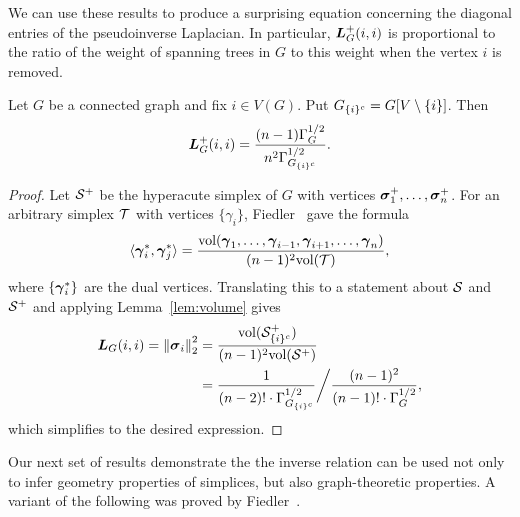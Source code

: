 We can  use these results to produce a surprising equation concerning  the diagonal entries of the pseudoinverse Laplacian. In particular, $\vb*{L}_G^+(i,i)$ is proportional to the ratio of the weight of  spanning trees in $G$ to this weight when the vertex $i$ is removed. 

\begin{lemma}
	\label{lem:L_G^+(i,i)_trees}
	Let $G$ be a connected graph and fix $i\in V(G)$. Put $G_{\{i\}^c}=G[V\setminus \{i\}]$. Then 
	\begin{equation}
	\vb*{L}_G^+(i,i) = \frac{(n-1)\Gamma_G^{1/2}}{n^2\Gamma_{G_{\{i\}^c}}^{1/2}}.
	\end{equation}
\end{lemma}
\begin{proof}
	Let $\mathcal{S}^+$ be  the hyperacute simplex of $G$ with vertices $\vb*{\sigma}_1^+,\dots,\vb*{\sigma}_n^+$. 
	For an arbitrary simplex $\mathcal{T}$ with vertices $\{\gamma_i\}$, 
Fiedler~\cite[Chapter 2]{fiedler2011matrices} gave  the formula 
	\begin{equation*}
	\langle \vb*{\gamma}_i^*,\vb*{\gamma}_j^*\rangle= \frac{\textnormal{vol}(\vb*{\gamma}_1,\dots,\vb*{\gamma}_{i-1},\vb*{\gamma}_{i+1},\dots,\vb*{\gamma}_n)}{(n-1)^2 \textnormal{vol}(\mathcal{T})},
	\end{equation*}
	where $\{\vb*{\gamma}_i^*\}$ are the dual vertices. Translating this to a statement about $\mathcal{S}$ and $\mathcal{S}^+$ and applying Lemma~\ref{lem:volume} gives 
	\begin{align*}
	\vb*{L}_G(i,i) = \norm{\vb*{\sigma}_i}_2^2 &= \frac{\textnormal{vol}(\mathcal{S}^+_{\{i\}^c})}{(n-1)^2\textnormal{vol}(\mathcal{S}^+)} \\
	&= \frac{1}{(n-2)!\cdot \Gamma_{G_{\{i\}^c}}^{1/2}} \bigg/ \frac{(n-1)^2}{(n-1)!\cdot \Gamma_G^{1/2}},
	\end{align*}
	which  simplifies to the desired expression. 
	
\end{proof}



Our next set of results demonstrate the the inverse relation can be used not only to infer geometry properties of simplices, but also graph-theoretic properties. A variant of the following  was proved by Fiedler~\cite{fiedler2011matrices}. 


